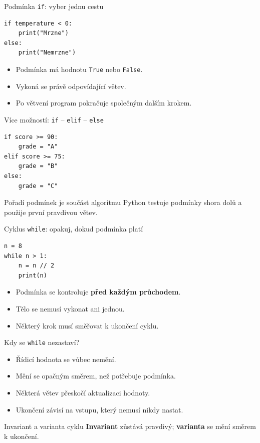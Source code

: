 \documentclass[aspectratio=169]{beamer}
\newcommand{\term}[1]{\textcolor{CodeBlue}{\textbf{#1}}}
\begin{document}
\begin{frame}[fragile]{Podmínka \texttt{if}: vyber jednu cestu}
\begin{lstlisting}[style=python]
if temperature < 0:
    print("Mrzne")
else:
    print("Nemrzne")
\end{lstlisting}
  \begin{itemize}
    \item Podmínka má hodnotu \texttt{True} nebo \texttt{False}.
    \item Vykoná se právě odpovídající větev.
    \item Po větvení program pokračuje společným dalším krokem.
  \end{itemize}
\end{frame}

\begin{frame}[fragile]{Více možností: \texttt{if} -- \texttt{elif} -- \texttt{else}}
\begin{lstlisting}[style=python]
if score >= 90:
    grade = "A"
elif score >= 75:
    grade = "B"
else:
    grade = "C"
\end{lstlisting}
  \begin{alertblock}{Pořadí podmínek je součást algoritmu}
    Python testuje podmínky shora dolů a použije první pravdivou větev.
  \end{alertblock}
\end{frame}

\begin{frame}[fragile]{Cyklus \texttt{while}: opakuj, dokud podmínka platí}
\begin{lstlisting}[style=python]
n = 8
while n > 1:
    n = n // 2
    print(n)
\end{lstlisting}
  \begin{itemize}
    \item Podmínka se kontroluje \textbf{před každým průchodem}.
    \item Tělo se nemusí vykonat ani jednou.
    \item Některý krok musí směřovat k ukončení cyklu.
  \end{itemize}
\end{frame}

\begin{frame}{Kdy se \texttt{while} nezastaví?}
  \begin{itemize}
    \item Řídicí hodnota se vůbec nemění.
    \item Mění se opačným směrem, než potřebuje podmínka.
    \item Některá větev přeskočí aktualizaci hodnoty.
    \item Ukončení závisí na vstupu, který nemusí nikdy nastat.
  \end{itemize}
  \begin{block}{Invariant a varianta cyklu}
    \term{Invariant} zůstává pravdivý; \term{varianta} se mění směrem k ukončení.
  \end{block}
\end{frame}
\end{document}
